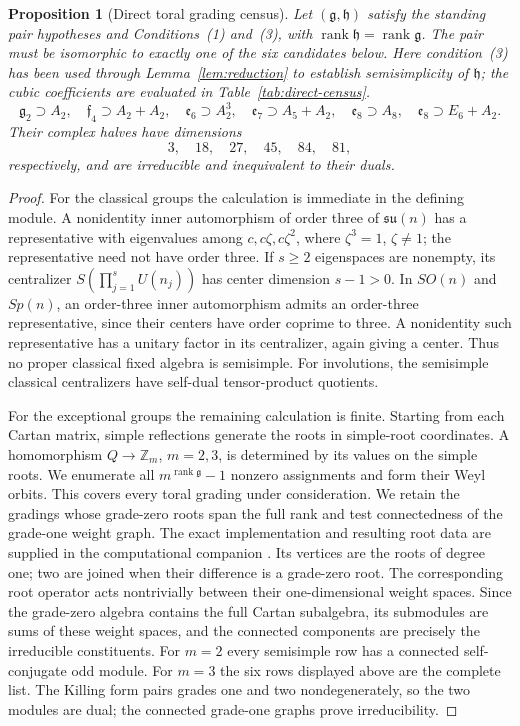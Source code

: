 \documentclass[11pt]{article}
\newtheorem{proposition}[theorem]{Proposition}
\theoremstyle{remark}
\newcommand{\g}{\mathfrak g}
\newcommand{\h}{\mathfrak h}
\newcommand{\e}{\mathfrak e}
\begin{document}
\begin{proposition}[Direct toral grading census]
\label{prop:direct-toral-census}
Let \((\g,\h)\) satisfy the standing pair hypotheses and
Conditions~\textup{(1)} and~\textup{(3)}, with
\(\operatorname{rank}\h=\operatorname{rank}\g\).
The pair must be isomorphic to exactly one of the six candidates below.
Here condition~\textup{(3)} has been used through
Lemma~\ref{lem:reduction} to establish semisimplicity of \(\h\);
the cubic coefficients are evaluated in Table~\ref{tab:direct-census}.
\[
 \mathfrak g_2\supset A_2,\quad
 \mathfrak f_4\supset A_2+A_2,\quad
 \e_6\supset A_2^3,\quad
 \e_7\supset A_5+A_2,\quad
 \e_8\supset A_8,\quad
 \e_8\supset E_6+A_2.
\]
Their complex halves have dimensions
\[
 3,\quad18,\quad27,\quad45,\quad84,\quad81,
\]
respectively, and are irreducible and inequivalent to their duals.
\end{proposition}
\begin{proof}
For the classical groups the calculation is immediate in the defining
module.  A nonidentity inner automorphism of order three of \(\mathfrak{su}(n)\)
has a representative with eigenvalues among \(c,c\zeta,c\zeta^2\), where
\(\zeta^3=1\), \(\zeta\ne1\); the representative need not have order three.
If \(s\ge2\) eigenspaces are nonempty, its centralizer
\(S(\prod_{j=1}^{s}U(n_j))\) has center dimension \(s-1>0\).
In \(SO(n)\) and \(Sp(n)\), an order-three inner automorphism admits an
order-three representative, since their centers have order coprime to three.
A nonidentity such representative has a
unitary factor in its centralizer, again giving a center.  Thus no proper
classical fixed algebra is semisimple.  For involutions, the semisimple
classical centralizers have self-dual tensor-product quotients.

For the exceptional groups the remaining calculation is finite. Starting
from each Cartan matrix, simple reflections generate the roots in
simple-root coordinates. A homomorphism \(Q\to\mathbb Z_m\), \(m=2,3\),
is determined by its values on the simple roots. We enumerate all
\(m^{\operatorname{rank}\g}-1\) nonzero assignments and form their Weyl
orbits. This covers every toral grading under consideration. We retain the
gradings whose grade-zero roots span the full rank and test connectedness
of the grade-one weight graph. The exact implementation and resulting
root data are supplied in the computational companion \cite{ComputationalCompanion}.
Its vertices are the roots of degree one; two are joined when their
difference is a grade-zero root. The corresponding root operator acts
nontrivially between their one-dimensional weight spaces. Since the
grade-zero algebra contains the full Cartan subalgebra, its submodules are
sums of these weight spaces, and the connected components are precisely the
irreducible constituents. For
\(m=2\) every semisimple row has a connected self-conjugate odd module.  For
\(m=3\) the six rows displayed above are the complete list.  The Killing
form pairs grades one and two nondegenerately, so the two modules are dual;
the connected grade-one graphs prove irreducibility.
\end{proof}
\end{document}
